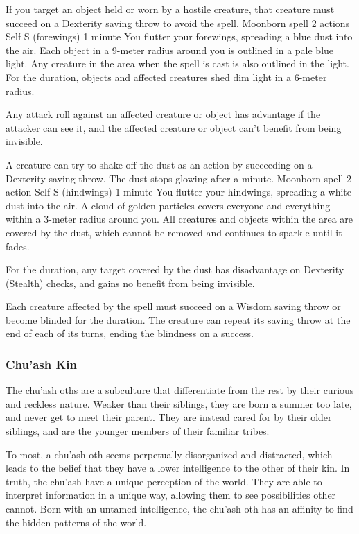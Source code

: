         If you target an object held or worn by a hostile creature, that creature must succeed on a Dexterity saving throw to avoid the spell.
        {Moonborn spell}
        {2 actions}
        {Self}
        {S (forewings)}
        {1 minute}
        You flutter your forewings, spreading a blue dust into the air.
        Each object in a 9-meter radius around you is outlined in a pale blue light.
        Any creature in the area when the spell is cast is also outlined in the light.
        For the duration, objects and affected creatures shed dim light in a 6-meter radius.

        Any attack roll against an affected creature or object has advantage if the attacker can see it, and the affected creature or object can't benefit from being invisible.

        A creature can try to shake off the dust as an action by succeeding on a Dexterity saving throw.
        The dust stops glowing after a minute.
        {Moonborn spell}
        {2 action}
        {Self}
        {S (hindwings)}
        {1 minute}
        You flutter your hindwings, spreading a white dust into the air.
        A cloud of golden particles covers everyone and everything within a 3-meter radius around you.
        All creatures and objects within the area are covered by the dust, which cannot be removed and continues to sparkle until it fades.

        For the duration, any target covered by the dust has disadvantage on Dexterity (Stealth) checks, and gains no benefit from being invisible.

        Each creature affected by the spell must succeed on a Wisdom saving throw or become blinded for the duration.
        The creature can repeat its saving throw at the end of each of its turns, ending the blindness on a success.

\subsubsection{Chu'ash Kin}
    The chu'ash oths are a subculture that differentiate from the rest by their curious and reckless nature.
    Weaker than their siblings, they are born a summer too late, and never get to meet their parent.
    They are instead cared for by their older siblings, and are the younger members of their familiar tribes.

    To most, a chu'ash oth seems perpetually disorganized and distracted, which leads to the belief that they have a lower intelligence to the other of their kin.
    In truth, the chu'ash have a unique perception of the world.
    They are able to interpret information in a unique way, allowing them to see possibilities other cannot.
    Born with an untamed intelligence, the chu'ash oth has an affinity to find the hidden patterns of the world.

